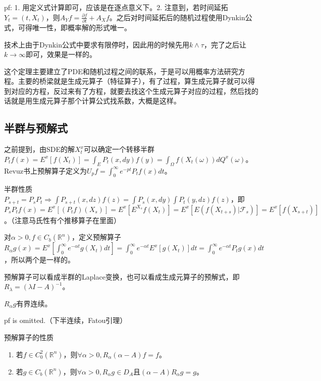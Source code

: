 pf: 1. 用定义式计算即可，应该是在逐点意义下。2. 注意到，若时间延拓$Y_t = (t, X_t)$，则$A_Y f = \frac{\partial f}{\partial t} + A_X f$。之后对时间延拓后的随机过程使用Dynkin公式，可得唯一性，即概率解的形式唯一。

技术上由于Dynkin公式中要求有限停时，因此用的时候先用$k \wedge \tau$，完了之后让$k \to \infty$即可，效果是一样的。

这个定理主要建立了PDE和随机过程之间的联系，于是可以用概率方法研究方程。主要的桥梁就是生成元算子（特征算子），有了过程，算生成元算子就可以得到对应的方程，反过来有了方程，就要去找这个生成元算子对应的过程，然后找的话就是用生成元算子那个计算公式找系数，大概是这样。

\subsection{半群与预解式}

之前提到，由SDE的解$X_t^x$可以确定一个转移半群$P_tf(x) = E^{x}\left[f\left(X_{t}\right)\right] = \int_E P_t(x, dy) f(y) = \int_\Omega f(X_t(\omega)) dQ^x(\omega)$。Revuz书上预解算子定义为$U_p f = \int_0^{\infty} e^{-p t} P_tf(x) dt$。

半群性质$P_{s + t} = P_s P_t \Rightarrow \int P_{s + t}(x, dz) f(z) = \int P_s(x, dy) \int P_t(y, dz) f(z)$，即$P_s P_t f(x) = E^x[ (P_t f)(X_s) ] = E^x[ E^{X_s} f(X_t) ] = E^x[ E(f(X_{t + s}) | \mathcal{F}_s) ] = E^x[f(X_{s + t})]$。（注意马氏性有个推移算子在里面）

对$\alpha>0, f \in C_{b}\left(\mathbb{R}^{n}\right)$，定义预解算子$R_{\alpha} g(x)=E^{x}\left[\int_{0}^{\infty} e^{-\alpha t} g\left(X_{t}\right) d t\right] = \int_0^\infty e^{-\alpha t} E^x[g(X_t)] dt = \int_0^{\infty} e^{-\alpha t} P_t g(x) dt$，所以两个是一样的。

预解算子可以看成半群的Laplace变换，也可以看成生成元算子的预解式，即$R_\lambda = (\lambda I - A)^{-1}$。

$R_{\alpha} g$有界连续。

pf is omitted.（下半连续，Fatou引理）

预解算子的性质
\begin{enumerate}
  \item 若$f \in C_{0}^{2}\left(\mathbb{R}^{n}\right)$，则$\forall \alpha>0, R_{\alpha}(\alpha-A) f=f$。
  \item 若$g \in C_{b}\left(\mathbb{R}^{n}\right)$，则$\forall \alpha>0, R_{\alpha} g \in D_{A}$且$(\alpha-A) R_{\alpha} g=g$。
\end{enumerate}

